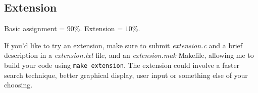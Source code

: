 \begin{exercise}
\subsection*{Extension}

Basic assignment = {\Large $90\%$}.
Extension = {\Large $10\%$}.

\noindent
If you'd like to try an extension, make sure to submit {\it extension.c}
and a brief description in a {\it extension.txt} file, and an {\it extension.mak} Makefile, allowing me to build your code using \verb^make extension^.
\noindent The extension could
involve a faster search technique, better graphical display, user input
or something else of your choosing.
\end{exercise}

